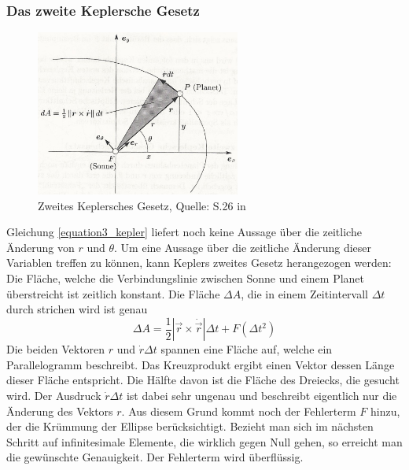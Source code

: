 \subsubsection{Das zweite Keplersche Gesetz}
\begin{figure}[h]                                                                           %
	\centering                                                                            	%
	\includegraphics[width=0.6\textwidth]{./images/keplers_law2.jpg}                        %
	\caption[Zweites keplersches Gesetz]{Zweites Keplersches Gesetz, Quelle: S.26 in \cite{Raumflugm}}                  %
	\label{fig:kegelsch_2}                                                                  %
\end{figure}                                                                              	%
Gleichung \ref{equation3_kepler} liefert noch keine Aussage über die zeitliche Änderung von \ensuremath{r} und \ensuremath{\theta}. Um eine Aussage über die zeitliche Änderung dieser Variablen treffen zu können, kann Keplers zweites Gesetz herangezogen werden: Die Fläche, welche die Verbindungslinie zwischen Sonne und einem Planet überstreicht ist zeitlich konstant. Die Fläche \ensuremath{\Delta A}, die in einem Zeitintervall \ensuremath{\Delta t} durch strichen wird ist genau
\begin{equation}
	\Delta A = \frac{1}{2}\left| \vec{r} \times \dot{\vec{r}} \right|\Delta t + F(\Delta t^2)
\end{equation}   
Die beiden Vektoren \ensuremath{r} und \ensuremath{\dot{r} \Delta t} spannen eine Fläche auf, welche ein Parallelogramm beschreibt. Das Kreuzprodukt ergibt einen Vektor dessen Länge dieser Fläche entspricht. Die Hälfte davon ist die Fläche des Dreiecks, die gesucht wird. Der Ausdruck \ensuremath{\dot{r} \Delta t} ist dabei sehr ungenau und beschreibt eigentlich nur die Änderung des Vektors \ensuremath{r}. Aus diesem Grund kommt noch der Fehlerterm \ensuremath{F} hinzu, der die Krümmung der Ellipse berücksichtigt. Bezieht man sich im nächsten Schritt auf infinitesimale Elemente, die wirklich gegen Null gehen, so erreicht man die gewünschte Genauigkeit. Der Fehlerterm wird überflüssig.  
